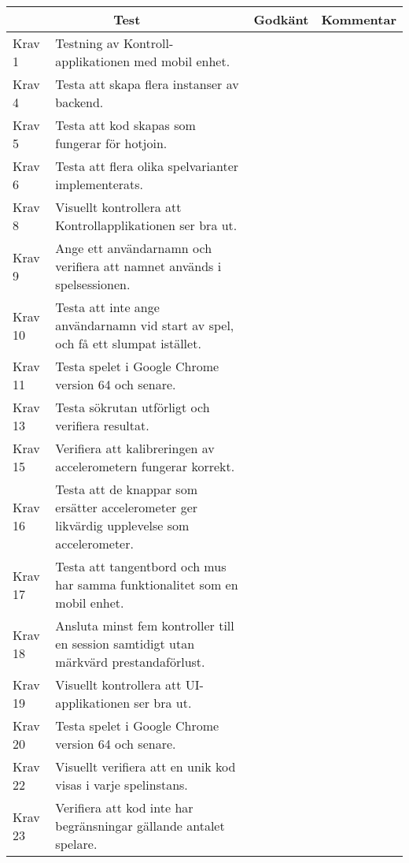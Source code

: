 \documentclass[10pt]{article}
\begin{document}
	\begin{tabular}{| p{1.5cm} | p{8cm} | p{1.2cm}| p{8cm}|}
	
  \hline
    \multicolumn{2}{|c|}{Test}&{Godkänt}&{Kommentar}\\
    \hline
    
		Krav 1&Testning av Kontroll-applikationen med mobil enhet.&&\\
		\hline
		Krav 4& Testa att skapa flera instanser av backend.&&\\
		\hline
		Krav 5&Testa att kod skapas som fungerar för hotjoin.&&\\
		\hline
		Krav 6&Testa att flera olika spelvarianter implementerats.&&\\
		\hline
		Krav 8&Visuellt kontrollera att Kontrollapplikationen ser bra ut.&&\\
		\hline
		Krav 9&Ange ett användarnamn och verifiera att namnet används i spelsessionen.&&\\
		\hline
		Krav 10&Testa att inte ange användarnamn vid start av spel, och få ett slumpat istället.&& \\
		\hline
		Krav 11&Testa spelet i Google Chrome version 64 och senare.&&\\
		\hline
		Krav 13&Testa sökrutan utförligt och verifiera resultat.&& \\
		\hline
		Krav 15&Verifiera att kalibreringen av accelerometern fungerar korrekt.&&\\
		\hline
		Krav 16&Testa att de knappar som ersätter accelerometer ger likvärdig upplevelse som accelerometer.&&\\
		\hline
		Krav 17&Testa att tangentbord och mus har samma funktionalitet som en mobil enhet.&&\\
		\hline
		Krav 18&Ansluta minst fem kontroller till en session samtidigt utan märkvärd prestandaförlust.&&\\
		\hline
		Krav 19&Visuellt kontrollera att UI-applikationen ser bra ut.&&\\
		\hline
		Krav 20&Testa spelet i Google Chrome version 64 och senare. &&\\
		\hline
		Krav 22&Visuellt verifiera att en unik kod visas i varje spelinstans.&&\\
		\hline
		Krav 23&Verifiera att kod inte har begränsningar gällande antalet spelare.&& \\
		\hline


   
  \end{tabular}
  \\
  \\
  
\end{document}
